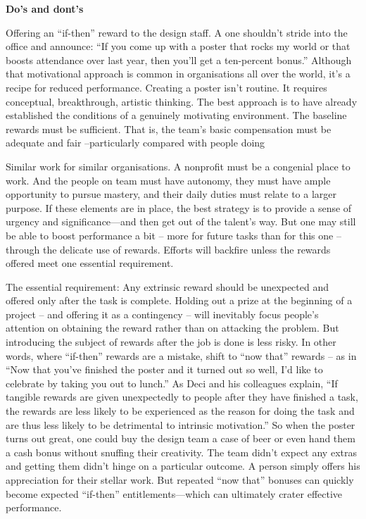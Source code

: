 \textbf{Do's and dont's}
\begin{compactitem}
\item  Offering an ``if-then'' reward to the design staff. A one shouldn't stride into the office and announce: ``If you come up with a poster that rocks my world or that boosts attendance over last year, then you’ll get a ten-percent bonus.'' Although that motivational approach is common in organisations all over the world, it’s a recipe for reduced performance. Creating a poster isn’t routine. It requires conceptual, breakthrough, artistic thinking. The best approach is to have already established the conditions of a genuinely motivating environment. The baseline rewards must be sufficient. That is, the team’s basic compensation must be adequate and fair --particularly compared with people doing
\item Similar work for similar organisations. A nonprofit must be a congenial place to work. And the people on team must have autonomy, they must have ample opportunity to pursue mastery, and their daily duties must relate to a larger purpose. If these elements are in place, the best strategy is to provide a sense of urgency and significance—and then get out of the talent’s way. But one may still be able to boost performance a bit -- more for future tasks than for this one -- through the delicate use of rewards. Efforts will backfire unless the rewards offered meet one essential requirement. 
\item The essential requirement: Any extrinsic reward should be unexpected and offered only after the task is complete.
Holding out a prize at the beginning of a project -- and offering it as a contingency -- will inevitably focus people’s attention on obtaining the reward rather than on attacking the problem. But introducing the subject of rewards after the job is done is less risky.
In other words, where ``if-then'' rewards are a mistake, shift to ``now that'' rewards -- as in ``Now that you’ve finished the poster and it turned out so well, I’d like to celebrate by taking you out to lunch.'' 
As Deci and his colleagues explain, ``If tangible rewards are given unexpectedly to people after they have finished a task, the rewards are less likely to be experienced as the reason for doing the task and are thus less likely to be detrimental to intrinsic motivation.'' So when the poster turns out great, one could buy the design team a case of beer or even hand them a cash bonus without snuffing their creativity. The team didn’t expect any extras and getting them didn’t hinge on a particular outcome. A person simply offers his appreciation for their stellar work. But repeated ``now that'' bonuses can quickly become expected ``if-then'' entitlements—which can ultimately crater effective performance.

\end{compactitem}
